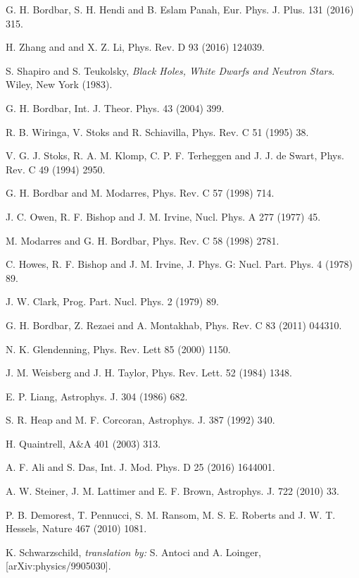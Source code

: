 \documentclass[aps]{revtex4}
\begin{document}
\begin{thebibliography}{999}
 G. H. Bordbar, S. H. Hendi and B. Eslam Panah, Eur.
Phys. J. Plus. 131 (2016) 315.

 H. Zhang and and X. Z. Li, Phys. Rev. D 93 (2016) 124039.



 S. Shapiro and S. Teukolsky, \textit{Black Holes, White
Dwarfs and Neutron Stars}. Wiley, New York (1983).

 G. H. Bordbar, Int. J. Theor. Phys. 43 (2004) 399.

 R. B. Wiringa, V. Stoks and R. Schiavilla, Phys. Rev. C 51
(1995) 38.

 V. G. J. Stoks, R. A. M. Klomp, C. P. F. Terheggen and J. J.
de Swart, Phys. Rev. C 49 (1994) 2950.

 G. H. Bordbar and M. Modarres, Phys. Rev. C 57 (1998)
714.

 J. C. Owen, R. F. Bishop and J. M. Irvine, Nucl. Phys. A 277
(1977) 45.

 M. Modarres and G. H. Bordbar, Phys. Rev. C 58 (1998)
2781.

 C. Howes, R. F. Bishop and J. M. Irvine, J. Phys. G: Nucl.
Part. Phys. 4 (1978) 89.

 J. W. Clark, Prog. Part. Nucl. Phys. 2 (1979) 89.

 G. H. Bordbar, Z. Rezaei and A. Montakhab, Phys.
Rev. C 83 (2011) 044310.

 N. K. Glendenning, Phys. Rev. Lett 85 (2000) 1150.

 J. M. Weisberg and J. H. Taylor, Phys. Rev. Lett. 52
(1984) 1348.

 E. P. Liang, Astrophys. J. 304 (1986) 682.

 S. R. Heap and M. F. Corcoran, Astrophys. J. 387 (1992) 340.

 H. Quaintrell, A\&A 401 (2003) 313.

 A. F. Ali and S. Das, Int. J. Mod. Phys. D 25 (2016) 1644001.

 A. W. Steiner, J. M. Lattimer and E. F. Brown,
Astrophys. J. 722 (2010) 33.

 P. B. Demorest, T. Pennucci, S. M. Ransom, M. S. E. Roberts
and J. W. T. Hessels, Nature 467 (2010) 1081.

 K. Schwarzschild, \textit{translation by:} S. Antoci
and A. Loinger, [arXiv:physics/9905030].


\end{thebibliography}
\end{document}

